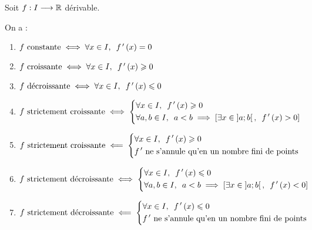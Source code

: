 \begin{theo}
Soit \(f:I\longrightarrow\mathbb{R}\) dérivable.

On a :

\begin{enumerate}
\item \(f\text{ constante}\ssi\quantifs{\forall x\in I}f\prim\paren{x}=0\) \\

\item \(f\text{ croissante}\ssi\quantifs{\forall x\in I}f\prim\paren{x}\geq0\) \\

\item \(f\text{ décroissante}\ssi\quantifs{\forall x\in I}f\prim\paren{x}\leq0\) \\

\item \(f\text{ strictement croissante}\ssi\begin{dcases}\quantifs{\forall x\in I}f\prim\paren{x}\geq0 \\ \quantifs{\forall a,b\in I}a<b\imp\croch{\quantifs{\exists x\in\intervee{a}{b}}f\prim\paren{x}>0}\end{dcases}\) \\

\item \(f\text{ strictement croissante}\impr\begin{dcases}\quantifs{\forall x\in I}f\prim\paren{x}\geq0 \\ f\prim\text{ ne s'annule qu'en un nombre fini de points}\end{dcases}\) \\

\item \(f\text{ strictement décroissante}\ssi\begin{dcases}\quantifs{\forall x\in I}f\prim\paren{x}\leq0 \\ \quantifs{\forall a,b\in I}a<b\imp\croch{\quantifs{\exists x\in\intervee{a}{b}}f\prim\paren{x}<0}\end{dcases}\) \\

\item \(f\text{ strictement décroissante}\impr\begin{dcases}\quantifs{\forall x\in I}f\prim\paren{x}\leq0 \\ f\prim\text{ ne s'annule qu'en un nombre fini de points}\end{dcases}\)
\end{enumerate}
\end{theo}

